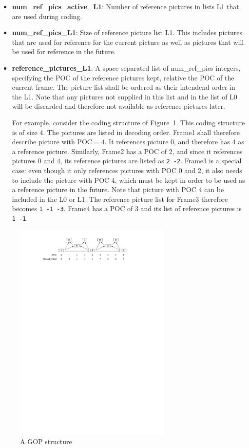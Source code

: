 \documentclass[a4paper,11pt]{jvetdoc}
\begin{document}
\begin{itemize}
\item[]\textbf{num_ref_pics_active_L1}: Number of reference pictures in lists L1
that are used during coding.

\item[]\textbf{num_ref_pics_L1}: Size of reference picture list L1.
This includes pictures that are used for reference for the
current picture as well as pictures that will be used for reference in
the future.

\item[]\textbf{reference_pictures_L1}: A space-separated list of
num_ref_pics integers, specifying the POC of the reference pictures
kept, relative the POC of the current frame. The picture list shall be
ordered as their intendend order in the L1.
Note that any pictures not supplied in this list and in the list of L0 will be discarded and
therefore not available as reference pictures later.

For example, consider the coding structure of Figure~\ref{fig:gop-example}.
This coding structure is of size 4. The pictures are listed in decoding
order. Frame1 shall therefore describe picture with $\textrm{POC}=4$. It
references picture 0, and therefore has 4 as a reference picture.
Similarly, Frame2 has a POC of 2, and since it references pictures 0 and
4, its reference pictures are listed as \verb|2 -2|. Frame3 is a special
case: even though it only references pictures with POC 0 and 2, it also
needs to include the picture with POC 4, which must be kept in order to
be used as a reference picture in the future. Note that picture with POC 4 can be
included in the L0 or L1. The reference picture list for Frame3 therefore becomes \verb|1 -1 -3|. 
Frame4 has a POC of 3 and its list of reference pictures is \verb|1 -1|.
\end{itemize}

\begin{figure}[h]
\caption{A GOP structure}
\label{fig:gop-example}
\centering
\includegraphics[width=0.7\textwidth]{figures/gop-structure-example}
\end{figure}
\end{document}
